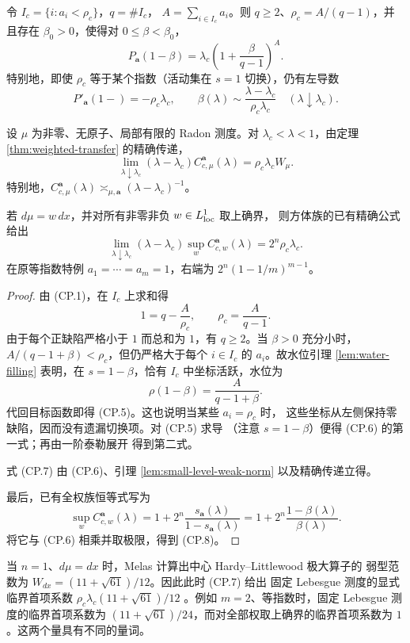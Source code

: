 \begin{theorem}[临界上侧的精确渐近]
令 $I_c=\{i:a_i<\rho_c\}$，$q=\#I_c$，
$A=\sum_{i\in I_c}a_i$。则 $q\ge2$、$\rho_c=A/(q-1)$，并且存在
$\beta_0>0$，使得对 $0\le\beta<\beta_0$，
\[
 P_{\boldsymbol a}(1-\beta)
 =\lambda_c\left(1+\frac{\beta}{q-1}\right)^A.
 \tag{CP.5}
\]
特别地，即使 $\rho_c$ 等于某个指数（活动集在 $s=1$ 切换），仍有左导数
\[
 P'_{\boldsymbol a}(1-)=-\rho_c\lambda_c,
 \qquad
 \beta(\lambda)\sim\frac{\lambda-\lambda_c}{\rho_c\lambda_c}
 \quad(\lambda\downarrow\lambda_c).
 \tag{CP.6}
\]

设 $\mu$ 为非零、无原子、局部有限的 Radon 测度。对 $\lambda_c<\lambda<1$，由定理
\ref{thm:weighted-transfer} 的精确传递，
\[
 \lim_{\lambda\downarrow\lambda_c}(\lambda-\lambda_c)
 C^{\boldsymbol a}_{c,\mu}(\lambda)=\rho_c\lambda_cW_\mu.
 \tag{CP.7}
\]
特别地，$C^{\boldsymbol a}_{c,\mu}(\lambda)
\asymp_{\mu,\boldsymbol a}(\lambda-\lambda_c)^{-1}$。

若 $d\mu=w\,dx$，并对所有非零非负 $w\in L^1_{\rm loc}$ 取上确界，
则方体族的已有精确公式给出
\[
 \lim_{\lambda\downarrow\lambda_c}
 (\lambda-\lambda_c)
 \sup_w C^{\boldsymbol a}_{c,w}(\lambda)
 =2^n\rho_c\lambda_c.
 \tag{CP.8}
\]
在原等指数特例 $a_1=\cdots=a_m=1$，右端为
$2^n(1-1/m)^{m-1}$。
\end{theorem}

\begin{proof}
由 \textup{(CP.1)}，在 $I_c$ 上求和得
\[
 1=q-\frac A{\rho_c},\qquad \rho_c=\frac A{q-1}.
 \tag{CP.9}
\]
由于每个正缺陷严格小于 $1$ 而总和为 $1$，有 $q\ge2$。当 $\beta>0$
充分小时，$A/(q-1+\beta)<\rho_c$，但仍严格大于每个
$i\in I_c$ 的 $a_i$。故水位引理 \ref{lem:water-filling} 表明，在
$s=1-\beta$，恰有 $I_c$ 中坐标活跃，水位为
\[
 \rho(1-\beta)=\frac A{q-1+\beta}.
\]
代回目标函数即得 \textup{(CP.5)}。这也说明当某些 $a_i=\rho_c$ 时，
这些坐标从左侧保持零缺陷，因而没有遗漏切换项。对 \textup{(CP.5)} 求导
（注意 $s=1-\beta$）便得 \textup{(CP.6)} 的第一式；再由一阶泰勒展开
得到第二式。

式 \textup{(CP.7)} 由 \textup{(CP.6)}、引理 \ref{lem:small-level-weak-norm} 以及精确传递立得。

最后，已有全权族恒等式写为
\[
 \sup_w C^{\boldsymbol a}_{c,w}(\lambda)
 =1+2^n\frac{s_{\boldsymbol a}(\lambda)}{1-s_{\boldsymbol a}(\lambda)}
 =1+2^n\frac{1-\beta(\lambda)}{\beta(\lambda)}.
\]
将它与 \textup{(CP.6)} 相乘并取极限，得到 \textup{(CP.8)}。
\end{proof}

\begin{remark}[一维 Lebesgue 情形]
当 $n=1$、$d\mu=dx$ 时，Melas 计算出中心 Hardy--Littlewood 极大算子的
弱型范数为 $W_{dx}=(11+\sqrt{61})/12$。因此此时 \textup{(CP.7)} 给出
固定 Lebesgue 测度的显式临界首项系数 $\rho_c\lambda_c(11+\sqrt{61})/12$
\cite{Melas2003}。例如 $m=2$、等指数时，固定 Lebesgue 测度的临界首项系数为 $(11+\sqrt{61})/24$，而对全部权取上确界的临界首项系数为 $1$。这两个量具有不同的量词。
\end{remark}
